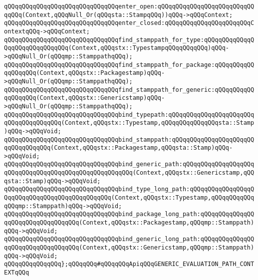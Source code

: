 \newline
\verb|qQQqqQQqqQQqqQQqqQQqqQQqqQQqqQQqenter_open:qQQqqQQqqQQqqQQqqQQqqQQqqQQqqQQq(Context,qQQqNull_Or(qQQqsta::StampqQQq))qQQq->qQQqContext;|\newline
\verb|qQQqqQQqqQQqqQQqqQQqqQQqqQQqqQQqenter_closed:qQQqqQQqqQQqqQQqqQQqqQQqContextqQQq->qQQqContext;|\newline
\newline
\verb|qQQqqQQqqQQqqQQqqQQqqQQqqQQqqQQqfind_stamppath_for_type:qQQqqQQqqQQqqQQqqQQqqQQqqQQqqQQq(Context,qQQqstx::TypestampqQQqqQQqqQQq)qQQq->qQQqNull_Or(qQQqmp::StamppathqQQq);|\newline
\verb|qQQqqQQqqQQqqQQqqQQqqQQqqQQqqQQqfind_stamppath_for_package:qQQqqQQqqQQqqQQqqQQq(Context,qQQqstx::Packagestamp)qQQq->qQQqNull_Or(qQQqmp::StamppathqQQq);|\newline
\verb|qQQqqQQqqQQqqQQqqQQqqQQqqQQqqQQqfind_stamppath_for_generic:qQQqqQQqqQQqqQQqqQQq(Context,qQQqstx::Genericstamp)qQQq->qQQqNull_Or(qQQqmp::StamppathqQQq);|\newline
\newline
\verb|qQQqqQQqqQQqqQQqqQQqqQQqqQQqqQQqbind_typepath:qQQqqQQqqQQqqQQqqQQqqQQqqQQqqQQqqQQqqQQq(Context,qQQqstx::Typestamp,qQQqqQQqqQQqqQQqsta::Stamp)qQQq->qQQqVoid;|\newline
\verb|qQQqqQQqqQQqqQQqqQQqqQQqqQQqqQQqbind_stamppath:qQQqqQQqqQQqqQQqqQQqqQQqqQQqqQQqqQQq(Context,qQQqstx::Packagestamp,qQQqsta::Stamp)qQQq->qQQqVoid;|\newline
\verb|qQQqqQQqqQQqqQQqqQQqqQQqqQQqqQQqbind_generic_path:qQQqqQQqqQQqqQQqqQQqqQQqqQQqqQQqqQQqqQQqqQQqqQQqqQQqqQQq(Context,qQQqstx::Genericstamp,qQQqsta::Stamp)qQQq->qQQqVoid;|\newline
\newline
\verb|qQQqqQQqqQQqqQQqqQQqqQQqqQQqqQQqbind_type_long_path:qQQqqQQqqQQqqQQqqQQqqQQqqQQqqQQqqQQqqQQqqQQqqQQq(Context,qQQqstx::Typestamp,qQQqqQQqqQQqqQQqmp::Stamppath)qQQq->qQQqVoid;|\newline
\verb|qQQqqQQqqQQqqQQqqQQqqQQqqQQqqQQqbind_package_long_path:qQQqqQQqqQQqqQQqqQQqqQQqqQQqqQQqqQQq(Context,qQQqstx::Packagestamp,qQQqmp::Stamppath)qQQq->qQQqVoid;|\newline
\verb|qQQqqQQqqQQqqQQqqQQqqQQqqQQqqQQqbind_generic_long_path:qQQqqQQqqQQqqQQqqQQqqQQqqQQqqQQqqQQq(Context,qQQqstx::Genericstamp,qQQqmp::Stamppath)qQQq->qQQqVoid;|\newline
\newline
\verb|qQQqqQQqqQQqqQQq};qQQqqQQq#qQQqqQQqApiqQQqGENERIC_EVALUATION_PATH_CONTEXTqQQq|\newline
